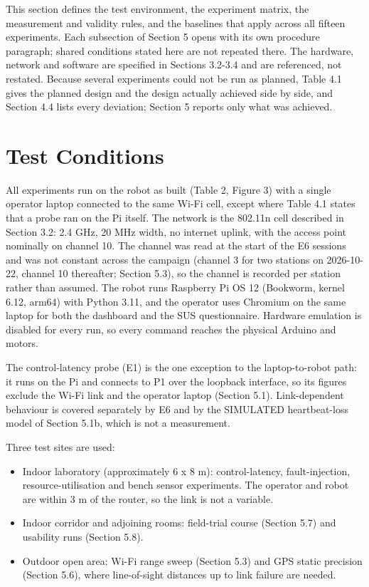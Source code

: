 This section defines the test environment, the experiment matrix, the measurement and validity rules, and the baselines that apply across all fifteen experiments. Each subsection of Section 5 opens with its own procedure paragraph; shared conditions stated here are not repeated there. The hardware, network and software are specified in Sections 3.2-3.4 and are referenced, not restated. Because several experiments could not be run as planned, Table 4.1 gives the planned design and the design actually achieved side by side, and Section 4.4 lists every deviation; Section 5 reports only what was achieved.

\section{Test Conditions}

All experiments run on the robot as built (Table 2, Figure 3) with a single operator laptop connected to the same Wi-Fi cell, except where Table 4.1 states that a probe ran on the Pi itself. The network is the 802.11n cell described in Section 3.2: 2.4 GHz, 20 MHz width, no internet uplink, with the access point nominally on channel 10. The channel was read at the start of the E6 sessions and was not constant across the campaign (channel 3 for two stations on 2026-10-22, channel 10 thereafter; Section 5.3), so the channel is recorded per station rather than assumed. The robot runs Raspberry Pi OS 12 (Bookworm, kernel 6.12, arm64) with Python 3.11, and the operator uses Chromium on the same laptop for both the dashboard and the SUS questionnaire. Hardware emulation is disabled for every run, so every command reaches the physical Arduino and motors.

The control-latency probe (E1) is the one exception to the laptop-to-robot path: it runs on the Pi and connects to P1 over the loopback interface, so its figures exclude the Wi-Fi link and the operator laptop (Section 5.1). Link-dependent behaviour is covered separately by E6 and by the SIMULATED heartbeat-loss model of Section 5.1b, which is not a measurement.

Three test sites are used:

\begin{itemize}
\item Indoor laboratory (approximately 6 x 8 m): control-latency, fault-injection, resource-utilisation and bench sensor experiments. The operator and robot are within 3 m of the router, so the link is not a variable.
\item Indoor corridor and adjoining rooms: field-trial course (Section 5.7) and usability runs (Section 5.8).
\item Outdoor open area: Wi-Fi range sweep (Section 5.3) and GPS static precision (Section 5.6), where line-of-sight distances up to link failure are needed.
\end{itemize}

